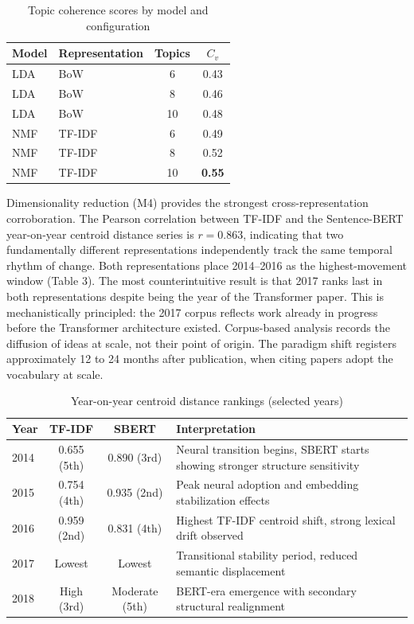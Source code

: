 \begin{table}[H]
\centering
\caption{Topic coherence scores by model and configuration}
\small

\begin{tabular}{llcc}
\toprule
\textbf{Model} & \textbf{Representation} & \textbf{Topics} & \textbf{$C_v$} \\
\midrule
LDA & BoW     & 6  & 0.43 \\
LDA & BoW     & 8  & 0.46 \\
LDA & BoW     & 10 & 0.48 \\
NMF & TF-IDF  & 6  & 0.49 \\
NMF & TF-IDF  & 8  & 0.52 \\
NMF & TF-IDF  & 10 & \textbf{0.55} \\
\bottomrule
\end{tabular}
\end{table}
Dimensionality reduction (M4) provides the strongest cross-representation corroboration. The Pearson correlation between TF-IDF and the Sentence-BERT year-on-year centroid distance series is $r = 0.863$, indicating that two fundamentally different representations independently track the same temporal rhythm of change. Both representations place 2014–2016 as the highest-movement window (Table 3). The most counterintuitive result is that 2017 ranks last in both representations despite being the year of the Transformer paper. This is mechanistically principled: the 2017 corpus reflects work already in progress before the Transformer architecture existed. Corpus-based analysis records the diffusion of ideas at scale, not their point of origin. The paradigm shift registers approximately 12 to 24 months after publication, when citing papers adopt the vocabulary at scale.
\begin{table}[H]
\centering
\caption{Year-on-year centroid distance rankings (selected years)}
\small
\begin{tabularx}{\linewidth}{l c c X}
\toprule
\textbf{Year} & \textbf{TF-IDF} & \textbf{SBERT} & \textbf{Interpretation} \\
\midrule
2014 & 0.655 (5th)          & 0.890 (3rd) & Neural transition begins, SBERT starts showing stronger structure sensitivity \\
2015 & 0.754 (4th)  & 0.935 (2nd) & Peak neural adoption and embedding stabilization effects \\
2016 & 0.959 (2nd)  & 0.831 (4th)         & Highest TF-IDF centroid shift, strong lexical drift observed \\
2017 & Lowest       & Lowest      & Transitional stability period, reduced semantic displacement \\
2018 & High (3rd)   & Moderate (5th) & BERT-era emergence with secondary structural realignment \\
\bottomrule
\end{tabularx}

\end{table}

